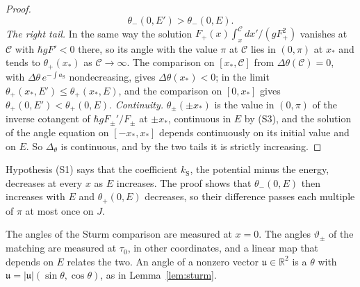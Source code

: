 \documentclass[aps,prd,onecolumn,tightenlines,nofootinbib,notitlepage,11pt,floatfix]{revtex4-2}
\theoremstyle{indentedtheorem}
\begin{document}
\begin{proof}
\begin{equation*}
    \theta_-(0,E') > \theta_-(0,E) .
\end{equation*}
\emph{The right tail.} In the same way the solution $F_+(x)\int_x^{\mathcal{C}}dx'/(gF_+^2)$ vanishes at $\mathcal{C}$ with $\hbar gF'<0$ there, so its angle with the value $\pi$ at $\mathcal{C}$ lies in $(0,\pi)$ at $x_*$ and tends to $\theta_+(x_*)$ as $\mathcal{C}\to\infty$. The comparison on $[x_*,\mathcal{C}]$ from $\Delta\theta(\mathcal{C})=0$, with $\Delta\theta\,e^{-\int a_\text{S}}$ nondecreasing, gives $\Delta\theta(x_*)<0$; in the limit $\theta_+(x_*,E')\leq\theta_+(x_*,E)$, and the comparison on $[0,x_*]$ gives $\theta_+(0,E')<\theta_+(0,E)$.
\emph{Continuity.} $\theta_\pm(\pm x_*)$ is the value in $(0,\pi)$ of the inverse cotangent of $\hbar gF_\pm'/F_\pm$ at $\pm x_*$, continuous in $E$ by (S3), and the solution of the angle equation on $[-x_*,x_*]$ depends continuously on its initial value and on $E$. So $\Delta_\theta$ is continuous, and by the two tails it is strictly increasing.
\end{proof}

\noindent Hypothesis (S1) says that the coefficient $k_\text{S}$, the potential minus the energy, decreases at every $x$ as $E$ increases. The proof shows that $\theta_-(0,E)$ then increases with $E$ and $\theta_+(0,E)$ decreases, so their difference passes each multiple of $\pi$ at most once on $J$.

The angles of the Sturm comparison are measured at $x=0$. The angles $\vartheta_\pm$ of the matching are measured at $\tau_0$, in other coordinates, and a linear map that depends on $E$ relates the two. An angle of a nonzero vector $\mathfrak{u}\in\mathbb{R}^2$ is a $\theta$ with $\mathfrak{u}=|\mathfrak{u}|(\sin\theta,\cos\theta)$, as in Lemma~\ref{lem:sturm}.
\end{document}
